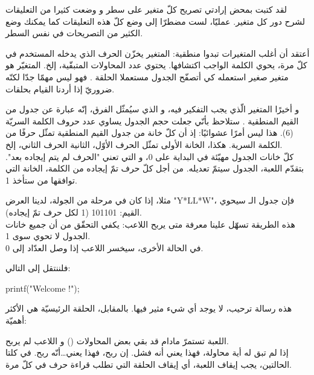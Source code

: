 لقد كتبت بمحض إرادتي تصريح كلّ متغير على سطر و وضعت كثيرا من التعليقات لشرح دور كل متغير. عمليّا، لست مضطرّا إلى وضع كلّ هذه التعليقات كما يمكنك وضع الكثير من التصريحات في نفس السطر.

أعتقد أن أغلب المتغيرات تبدوا منطقية: المتغير
يخزّن الحرف الذي يدخله المستخدم في كلّ مرة،
يحوي الكلمة الواجب اكتشافها.
يحتوي عدد المحاولات المتبقّية، إلخ. المتغيّر
هو متغير صغير استعمله كي أتصفّح الجدول مستعملا الحلقة
.
فهو ليس مهمّا جدّا لكنّه ضروريّ إذا أردنا القيام بحلقات.

و أخيرًا المتغير الّذي يجب التفكير فيه، و الذي سيُمثّل الفرق، إنّه عبارة عن جدول من القيم المنطقية
.
ستلاحظ بأنّي جعلت حجم الجدول يساوي عدد حروف الكلمة السريّة (6). هذا ليس أمرًا عشوائيًا: إذ أن كلّ خانة من جدول القيم المنطقية  تمثّل حرفًا من الكلمة السرية. هكذا، الخانة الأولى تمثّل الحرف الأوّل، الثانية الحرف الثاني، إلخ.\\
كلّ خانات الجدول مهيّئة في البداية على 0، و التي تعني "الحرف لم يتم إيجاده بعد". بتقدّم اللعبة، الجدول سيتمّ تعديله. من أجل كلّ حرف تمّ إيجاده من الكلمة، الخانة التي توافقها من
ستأخذ 1.

مثلا، إذا كان في مرحلة من الجولة، لدينا العرض
"\textenglish{Y*LL*W}"،
فإن جدول الـ
سيحوي القيم: 101101 (1 لكل حرف تمّ إيجاده).\\
هذه الطريقة تسهّل علينا معرفة متى يربح اللاعب: يكفي التحقّق من أن جميع خانات الجدول لا تحوي سوى 1.\\
في الحالة الأخرى، سيخسر اللاعب إذا وصل العدّاد
إلى 0.

فلننتقل إلى التالي:

\begin{Csource}
printf("Welcome !\n\n");
\end{Csource}

هذه رسالة ترحيب، لا يوجد أي شيء مثير فيها. بالمقابل، الحلقة الرئيسيّة هي  الأكثر أهميّة:

\begin{Csource}
while (remainingTries  > 0 && !win(foundLetter))
{
\end{Csource}

اللعبة تستمرّ مادام قد بقي بعض المحاولات
()
و اللاعب لم يربح.\\
إذا لم تبق له أية محاولة، فهذا يعني أنه فشل. إن ربح، فهذا يعني\dots أنّه ربح. في كلتا الحالتين، يجب إيقاف اللعبة، أي إيقاف الحلقة التي تطلب قراءة حرف في كلّ مرة.

